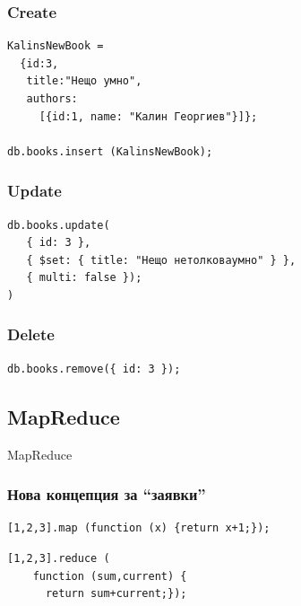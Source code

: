 \documentclass{beamer}
\begin{document}
\begin{frame}[fragile]
\frametitle{Create}

\begin{lstlisting}
KalinsNewBook = 
  {id:3, 
   title:"Нещо умно", 
   authors:
     [{id:1, name: "Калин Георгиев"}]};

db.books.insert (KalinsNewBook);
\end{lstlisting}


\end{frame}


\begin{frame}[fragile]
\frametitle{Update}

\begin{lstlisting}
db.books.update(
   { id: 3 },
   { $set: { title: "Нещо нетолковаумно" } },
   { multi: false });
)\end{lstlisting}


\end{frame}

\begin{frame}[fragile]
\frametitle{Delete}

\begin{lstlisting}
db.books.remove({ id: 3 });
\end{lstlisting}


\end{frame}

\subsection{MapReduce}

\begin{frame}
\centerline{MapReduce}
\end{frame}


\begin{frame}[fragile]
\frametitle{Нова концепция за ``заявки''}


\lstset{language=JavaScript}



\begin{lstlisting}
[1,2,3].map (function (x) {return x+1;});
\end{lstlisting}

\vspace{0.2cm}
\pause

\begin{lstlisting}
[1,2,3].reduce (
    function (sum,current) {
      return sum+current;});
\end{lstlisting}


\end{frame}
\end{document}
